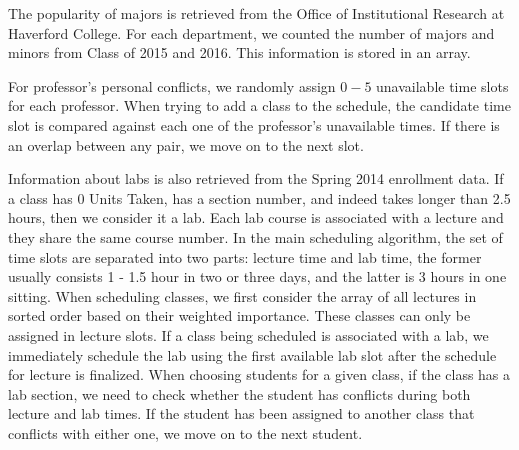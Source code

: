 \documentclass[11pt, oneside]{article}   	%
\begin{document}
\par The popularity of majors is retrieved from the Office of Institutional Research at Haverford College. For each department, we counted the number of majors and minors from Class of 2015 and 2016. This information is stored in an array.
\par For professor's personal conflicts, we randomly assign $0-5$ unavailable time slots for each professor. When trying to add a class to the schedule, the candidate time slot is compared against each one of the professor's unavailable times. If there is an overlap between any pair, we move on to the next slot.
\par Information about labs is also retrieved from the Spring 2014 enrollment data. If a class has $0$ Units Taken, has a section number, and indeed takes longer than 2.5 hours, then we consider it a lab. Each lab course is associated with a lecture and they share the same course number. In the main scheduling algorithm, the set of time slots are separated into two parts: lecture time and lab time, the former usually consists 1 - 1.5 hour in two or three days, and the latter is 3 hours in one sitting. When scheduling classes, we first consider the array of all lectures in sorted order based on their weighted importance. These classes can only be assigned in lecture slots. If a class being scheduled is associated with a lab, we immediately schedule the lab using the first available lab slot after the schedule for lecture is finalized. When choosing students for a given class, if the class has a lab section, we need to check whether the student has conflicts during both lecture and lab times. If the student has been assigned to another class that conflicts with either one, we move on to the next student.
\end{document}
